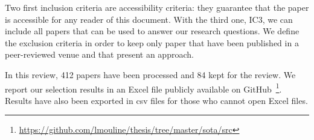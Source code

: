 Two first inclusion criteria are accessibility criteria: they guarantee that the paper is accessible for any reader of this document.
With the third one, IC3, we can include all papers that can be used to answer our research questions.
We define the exclusion criteria in order to keep only paper that have been published in a peer-reviewed venue and that present an approach.

In this review, 412 papers have been processed and 84 kept for the review.
We report our selection results in an Excel file publicly available on GitHub~\footnote{\url{https://github.com/lmouline/thesis/tree/master/sota/src}}.
Results have also been exported in \gls{csv} files for those who cannot open Excel files.

